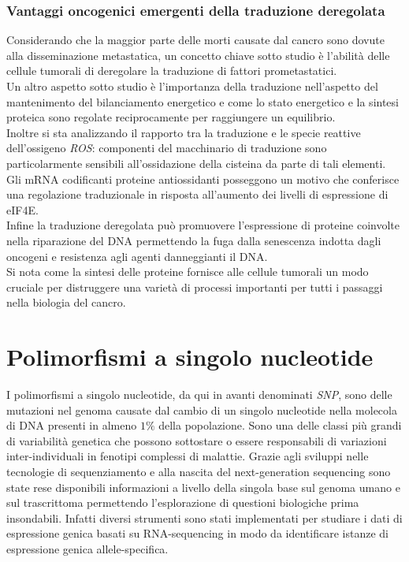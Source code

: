 		
		\subsubsection{Vantaggi oncogenici emergenti della traduzione deregolata}
		Considerando che la maggior parte delle morti causate dal cancro sono dovute alla disseminazione metastatica, un concetto chiave sotto studio \`e l'abilit\`a delle cellule tumorali di deregolare la traduzione di fattori prometastatici.\\
		Un altro aspetto sotto studio \`e l'importanza della traduzione nell'aspetto del mantenimento del bilanciamento energetico e come lo stato energetico e la sintesi proteica sono regolate reciprocamente per raggiungere un equilibrio.\\
		Inoltre si sta analizzando il rapporto tra la traduzione e le specie reattive dell'ossigeno \emph{ROS}: componenti del macchinario di traduzione sono particolarmente sensibili all'ossidazione della cisteina da parte di tali elementi.
		Gli mRNA codificanti proteine antiossidanti posseggono un motivo che conferisce una regolazione traduzionale in risposta all'aumento dei livelli di espressione di eIF4E.\\
		Infine la traduzione deregolata pu\`o promuovere l'espressione di proteine coinvolte nella riparazione del DNA permettendo la fuga dalla senescenza indotta dagli oncogeni e resistenza agli agenti danneggianti il DNA.\\
		Si nota come la sintesi delle proteine fornisce alle cellule tumorali un modo cruciale per distruggere una variet\`a di processi importanti per tutti i passaggi nella biologia del cancro.


\section{Polimorfismi a singolo nucleotide}
I polimorfismi a singolo nucleotide, da qui in avanti denominati \emph{SNP}, sono delle mutazioni nel genoma causate dal cambio di un singolo nucleotide nella molecola di DNA presenti in almeno $1\%$ della popolazione.
Sono una delle classi pi\`u grandi di variabilit\`a genetica che possono sottostare o essere responsabili di variazioni inter-individuali in fenotipi complessi di malattie.
Grazie agli sviluppi nelle tecnologie di sequenziamento e alla nascita del next-generation sequencing sono state rese disponibili informazioni a livello della singola base sul genoma umano e sul trascrittoma permettendo l'esplorazione di questioni biologiche prima insondabili.
Infatti diversi strumenti sono stati implementati per studiare i dati di espressione genica basati su RNA-sequencing in modo da identificare istanze di espressione genica allele-specifica.

